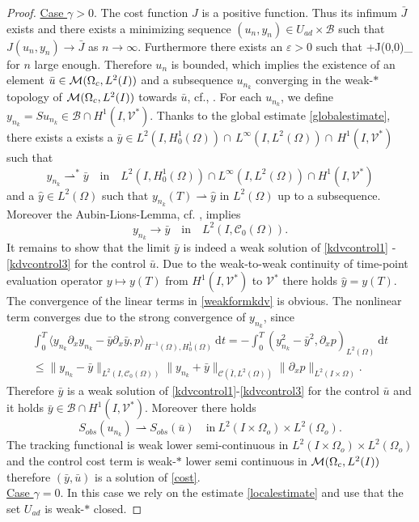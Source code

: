 \begin{proof}
\underline{Case $\gamma > 0$}. The cost function $J$ is a positive function. Thus its infimum $\bar J$ exists and there exists a minimizing sequence $(u_n,y_n) \in U_{ad} \times \mathcal B$ such that $J(u_n, y_n) \rightarrow \bar J$ as $n \rightarrow \infty$. Furthermore there exists an $\varepsilon>0$ such that
\be
\varepsilon+J(0,0)\geq \alpha {}_{\M}
\ee
for $n$ large enough. Therefore $u_n$ is bounded, which implies the existence of an element $\bar u\in\mathcal{M}(\Omega_c, L^{2}(I))$ and a subsequence $u_{n_k}$ converging in the weak-$*$ topology of $\mathcal{M}(\Omega_c, L^{2}(I))$ towards $\bar u$, cf., \cite[Corollary 3.30]{Brezis11}. For each $u_{n_k}$, we define $y_{n_k}=Su_{n_k}\in \mathcal B\cap H^1(I,\mathcal V^*)$. Thanks to the global estimate \eqref{globalestimate}, there exists a exists a $\bar y\in L^2(I,H^1_0(\Omega))\cap\,L^\infty(I,L^2(\Omega))\cap\,H^1(I,\mathcal V^\ast)$ such that
\[y_{n_k}\rightharpoonup^\ast\bar y\quad\text{in}\quad L^2(I,H^1_0(\Omega))\cap L^{\infty}(I,L^2(\Omega))\cap H^1(I,\mathcal V^\ast)\]
and a $\hat y\in L^2(\Omega)$ such that $y_{n_k}(T)\rightharpoonup \hat y$ in $L^2(\Omega)$ up to a subsequence. Moreover the Aubin-Lions-Lemma, cf. \cite[Chapter 3, Proposition 1.3]{showalter97}, implies
\[y_{n_k}\rightarrow\bar y\quad\text{in}\quad L^2(I,\mathcal C_0(\Omega)).\]
It remains to show that the limit $\bar y$ is indeed a weak solution of \eqref{kdvcontrol1} - \eqref{kdvcontrol3} for the control $\bar u$. Due to the weak-to-weak continuity of time-point evaluation operator $y\mapsto y(T)$ from $H^1(I,\mathcal V^\ast)$ to $\mathcal V^\ast$ there holds $\hat y=y(T)$.  The convergence of the linear terms in \eqref{weakformkdv} is obvious. The nonlinear term converges due to the strong convergence of $y_{n_k}$, since
\begin{multline*}
\int_0^T\langle y_{n_k}\partial_xy_{n_k}-\bar y\partial_x\bar y,p\rangle_{H^{-1}(\Omega),H^1_0(\Omega)}~\mathrm dt=-\int_0^T(y_{n_k}^2-\bar y^2,\partial_x p)_{L^2(\Omega)}~\mathrm dt\\
\leq\|y_{n_k}-\bar y\|_{L^2(I,\mathcal C_0(\Omega))}\|y_{n_k}+\bar y\|_{\mathcal C(\bar I,L^2(\Omega))}\|\partial_x p\|_{L^2(I\times \Omega)}.
\end{multline*}
Therefore $\bar y$ is a weak solution of \eqref{kdvcontrol1}-\eqref{kdvcontrol3} for the control $\bar u$ and it holds $\bar y\in \mathcal B\cap H^1(I,\mathcal V^*)$. Moreover there holds
\[S_{obs}(u_{n_k})\rightharpoonup S_{obs}(\bar u)\quad\text{in}~ L^2(I\times \Omega_{o})\times L^2(\Omega_{o}).\] The tracking functional is weak lower semi-continuous in $ L^2(I\times \Omega_{o})\times L^2(\Omega_{o})$ and the control cost term is weak-$*$ lower semi continuous in $\mathcal{M}(\Omega_c, L^{2}(I))$ therefore $(\bar y,\bar u)$ is a solution of \eqref{cost}.\\
\underline{Case $\gamma = 0$}. In this case we rely on the estimate \eqref{localestimate} and use that the set $U_{ad}$ is weak-$*$ closed.
\qquad\end{proof}
